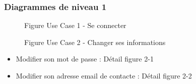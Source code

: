\documentclass[a4paper, 11pt]{article}
\begin{document}
        \subsubsection{ Diagrammes de niveau 1}
        \begin{figure}[h]
        \caption{Figure Use Case 1 - Se connecter}
        \label{fig-diag-use-case-1}
        \end{figure}
	\begin{figure}[h]
        \caption{Figure Use Case 2 - Changer ses informations}
        \label{fig-diag-use-case-2-2}
        \end{figure}
	\begin{itemize}
        \item Modifier son mot de passe : Détail figure 2-1
        \item Modifier son adresse email de contacte : Détail figure 2-2
        \end{itemize}
\end{document}
